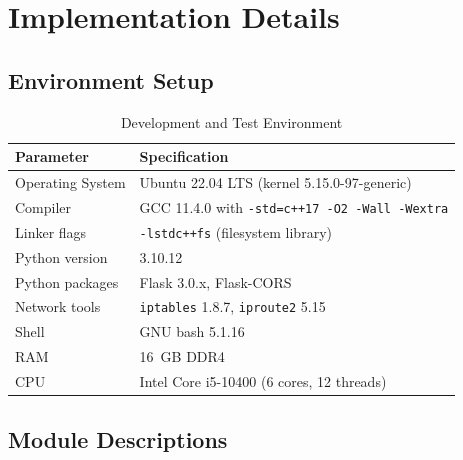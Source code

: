 \chapter{Implementation Details}

\section{Environment Setup}

\begin{table}[H]
\centering
\caption{Development and Test Environment}
\label{tab:environment}
\begin{tabularx}{\linewidth}{p{4.5cm} X}
\toprule
Parameter & Specification \\
\midrule
Operating System & Ubuntu 22.04 LTS (kernel 5.15.0-97-generic) \\
Compiler & GCC 11.4.0 with \texttt{-std=c++17 -O2 -Wall -Wextra} \\
Linker flags & \texttt{-lstdc++fs} (filesystem library) \\
Python version & 3.10.12 \\
Python packages & Flask 3.0.x, Flask-CORS \\
Network tools & \texttt{iptables} 1.8.7, \texttt{iproute2} 5.15 \\
Shell & GNU bash 5.1.16 \\
RAM & 16~GB DDR4 \\
CPU & Intel Core i5-10400 (6 cores, 12 threads) \\
\bottomrule
\end{tabularx}
\end{table}

\section{Module Descriptions}

